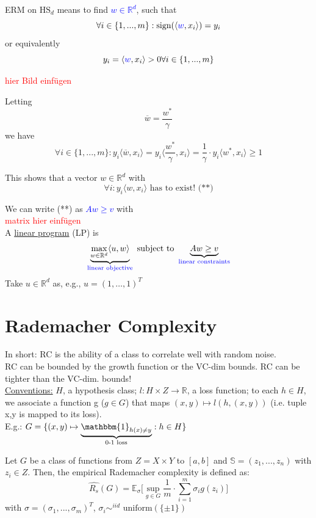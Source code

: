 \documentclass[10pt,a4paper]{article}
\theoremstyle{remark}
\theoremstyle{definition}
\theoremstyle{plain}
\begin{document}
ERM on $\text{HS}_d$ means to find \textcolor{blue}{$w \in \mathbb{R}^{d}$}, such that 
$$
\forall i \in \{ 1, ..., m \}: \text{sign}(\langle \textcolor{blue}{w}, x_i\rangle) = y_i
$$
or equivalently 
$$
y_i =  \langle \textcolor{blue}{w}, x_i\rangle > 0 \forall i \in \{ 1, ..., m \}
$$

\textcolor{red}{hier Bild einfügen}

Letting $$\overline{w} =  \frac{w^*}{\gamma}$$ we have 
$$
	\forall i \in \{ 1, ..., m \}: y_i \langle \overline{w}, x_i\rangle = y_i \langle \frac{w^*}{\gamma}, x_i \rangle = \frac{1}{\gamma} \cdot y_i \langle w^*, x_i \rangle \geq 1
$$

This shows that a vector $w \in \mathbb{R}^{d}$ with
$$
	\forall i: y_i \langle w, x_i \rangle \text{ has to exist! (**)}
$$

We can write (**) as \textcolor{blue}{$Aw \geq v$} with \\
\textcolor{red}{ matrix hier einfügen}\\
A \underline{linear program} (LP) is
$$
	\underbrace{\max_{w \in \mathbb{R}^{d}} \langle u, w \rangle}_{\text{\textcolor{blue}{linear objective}}} \text{ subject to } 
	\underbrace{Aw \geq v}_{\textcolor{blue}{\text{linear constraints}}}
$$ 
Take $u \in \mathbb{R}^{d}$ as, e.g., $u = (1, \hdots, 1)^T$ 

\part{Rademacher Complexity}
In short: RC is the ability of a class to correlate well with random noise.\\
RC can be bounded by the growth function or the VC-dim bounds. RC can be tighter than the VC-dim. bounds!\\
\underline{Conventions:} $H$, a hypothesis class; $l: H\times Z \to \mathbb{R}$, a loss function; to each $h \in H$, we associate a function g ($ g \in G$) that maps $(x,y) \mapsto l(h, (x,y)) $ (i.e. tuple x,y is mapped to its loss).\\
\newline
E.g.: $G = \{ (x,y) \mapsto \underbrace{\mathbbm{1}_{h(x) \neq y}}_{\text{0-1 loss}}: h\in H \}$

\begin{boxeddef}
	Let $G$ be a class of functions from $Z = X \times Y$ to $[a, b]$ and $\mathbb{S} = (z_1, ..., z_n)$ with $z_i \in Z$. Then, the empirical Rademacher complexity is defined as:
	$$
		\hat{R_s}(G) = \mathbb{E}_\sigma\bigg[\sup_{g \in G} \frac{1}{m} \cdot \sum_{i = 1}^{m} \sigma_i g(z_i)\bigg]
	$$
	with $\sigma = (\sigma_1, ..., \sigma_m)^T$, $\sigma_i \sim^{iid} \text{ uniform}\left(\{ \pm 1 \}\right)$
\end{boxeddef}
\end{document}
